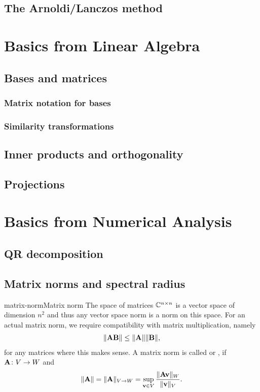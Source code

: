 \section{The Arnoldi/Lanczos method}



\appendix
\chapter{Basics from Linear Algebra}
\section{Bases and matrices}
\subsection{Matrix notation for bases}

\subsection{Similarity transformations}

\section{Inner products and orthogonality}

\section{Projections}


\chapter{Basics from Numerical Analysis}

\section{QR decomposition}


\section{Matrix norms and spectral radius}

\begin{Definition*}{matrix-norm}{Matrix norm}
  The space of matrices $\mathbb C^{n\times n}$ is a vector space of dimension $n^2$ and thus any vector space norm is a norm on this space. For an actual matrix norm, we require compatibility with matrix multiplication, namely
  \begin{gather}
    \lVert\mathbf A\mathbf B\rVert \le \lVert\mathbf A\rVert\lVert\mathbf B\rVert,
  \end{gather}
  for any matrices where this makes sense. A matrix norm is called  or , if $\mathbf A\colon V\to W$ and
  \begin{gather}
    \lVert\mathbf A\rVert = \lVert\mathbf A\rVert_{V\to W} = \sup_{\mathbf v\in V}\frac{\lVert\mathbf A\mathbf v\rVert_W}{\lVert\mathbf v\rVert_V}.
  \end{gather}
\end{Definition*}

